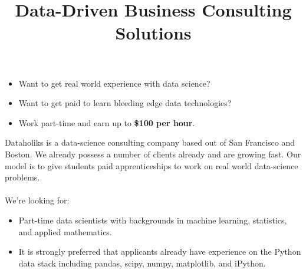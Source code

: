 \documentclass[11pt]{article}
\begin{document}

\begin{titlepage}


\thispagestyle{empty}

\vspace{-1in}

\title{\vspace{-0.5in} Data-Driven Business Consulting Solutions}
\date{}
\maketitle
%
\vspace{-0.75in}

\begin{itemize}
	\item Want to get real world experience with data science?
	\item Want to get paid to learn bleeding edge data technologies? 
	\item Work part-time and earn up to \textbf{\$100 per hour}.  
\end{itemize}

\noindent Dataholiks is a data-science consulting company based out of San Francisco and Boston.  We already possess a number of clients already and are growing fast.  Our model is to give students paid apprenticeships to work on real world data-science problems. 
\\
\\
\noindent We’re looking for:
\begin{itemize}
	\item Part-time data scientists with backgrounds in machine learning, statistics, and applied mathematics.  
	\item It is strongly preferred that applicants already have experience on the Python data stack including pandas, scipy, numpy, matplotlib, and iPython. 
\end{itemize}


\end{titlepage}
\end{document}
